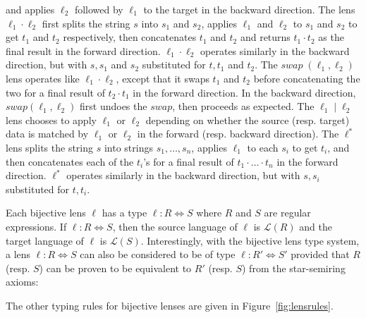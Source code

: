 \documentclass[acmsmall,review,anonymous]{acmart}
\newcommand{\kw}[1]{\ensuremath{\mathit{#1}}}
\newcommand{\swap}{\ensuremath{\kw{swap}}}
\begin{document}
and applies $\ell_2$ followed by $\ell_1$ to the target in the backward direction.
The lens $\ell_1 \cdot \ell_2$ first splits the string $s$ into $s_1$ and $s_2$,
applies $\ell_1$ and $\ell_2$ to $s_1$ and $s_2$ to get $t_1$ and $t_2$
respectively, then concatenates $t_1$ and $t_2$ and returns $t_1 \cdot t_2$ as
the final result in the forward direction. $\ell_1 \cdot \ell_2$ operates
similarly in the backward direction, but with $s, s_1$ and $s_2$ substituted
for $t, t_1$ and $t_2$. The $\mathit{\swap} \; (\ell_1, \ell_2)$ lens operates
like $\ell_1 \cdot \ell_2$, except that it swaps $t_1$ and $t_2$ before
concatenating the two for a final result of $t_2 \cdot t_1$ in the forward
direction. In the backward direction, $\mathit{\swap}(\ell_1, \ell_2)$ first undoes
the \swap, then proceeds as expected. The $\ell_1 \; | \; \ell_2$ lens
chooses to apply $\ell_1$ or $\ell_2$ depending on whether the source
(resp. target) data is matched by $\ell_1$ or $\ell_2$ in the forward (resp.
backward direction). The $\ell^*$ lens splits the string $s$ into strings $s_1,
\ldots, s_n$, applies $\ell_1$ to each $s_i$ to get $t_i$, and then concatenates
each of the $t_i$'s for a final result of $t_1 \cdot \ldots \cdot t_n$ in the
forward direction. $\ell^*$ operates similarly in the backward direction, but
with $s, s_i$ substituted for $t, t_i$.

Each bijective lens $\ell$ has a type $\ell : R \Leftrightarrow S$ where $R$ and
$S$ are regular expressions. If $\ell : R \Leftrightarrow S$, then the source
language of $\ell$ is $\mathcal{L}(R)$ and the target language of $\ell$ is
$\mathcal{L}(S)$. Interestingly, with the bijective lens type system, a lens
$\ell : R \Leftrightarrow S$ can also be considered to be of type $\ell : R'
\Leftrightarrow S'$ provided that $R$ (resp. $S$) can be proven to be
equivalent to $R'$ (resp. $S$) from the star-semiring axioms:

\begin{prooftree}
\end{prooftree}

The other typing rules for bijective lenses are given in
Figure~\ref{fig:lensrules}.
\end{document}
